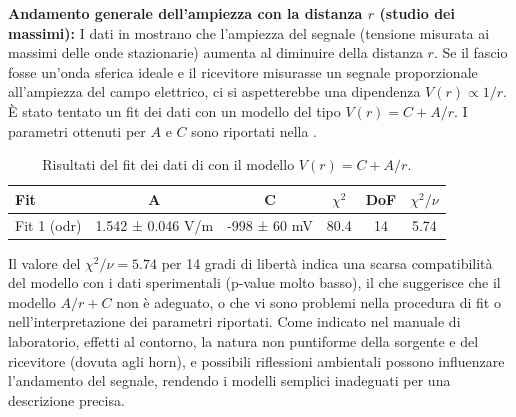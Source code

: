 \documentclass[a4paper]{article}
\begin{document}
\textbf{Andamento generale dell'ampiezza con la distanza $r$ (studio dei massimi):}
I dati in  mostrano che l'ampiezza del segnale (tensione misurata ai massimi delle onde stazionarie) aumenta al diminuire della distanza $r$. Se il fascio fosse un'onda sferica ideale e il ricevitore misurasse un segnale proporzionale all'ampiezza del campo elettrico, ci si aspetterebbe una dipendenza $V(r) \propto 1/r$.
È stato tentato un fit dei dati con un modello del tipo $V(r) = C + A/r$. I parametri ottenuti per $A$ e $C$ sono riportati nella .

\begin{table}[htbp]
\centering
\begin{tabular}{|l|ccccc|}
\hline
Fit & A & C & $\chi^2$ & DoF & $\chi^2/\nu$ \\\hline\hline
Fit 1 (odr) & 1.542 ± 0.046 V/m & -998 ± 60 mV & 80.4 & 14 & 5.74 \\\hline
\end{tabular}
\caption{Risultati del fit dei dati di  con il modello $V(r) = C + A/r$.}
\label{tab:risultati_fit_ampgeom_1_su_r}
\end{table}

Il valore del $\chi^2/\nu = \num{5.74}$ per 14 gradi di libertà indica una scarsa compatibilità del modello con i dati sperimentali (p-value molto basso), il che suggerisce che il modello $A/r + C$ non è adeguato, o che vi sono problemi nella procedura di fit o nell'interpretazione dei parametri riportati.
Come indicato nel manuale di laboratorio, effetti al contorno, la natura non puntiforme della sorgente e del ricevitore (dovuta agli horn), e possibili riflessioni ambientali possono influenzare l'andamento del segnale, rendendo i modelli semplici inadeguati per una descrizione precisa.
\end{document}
